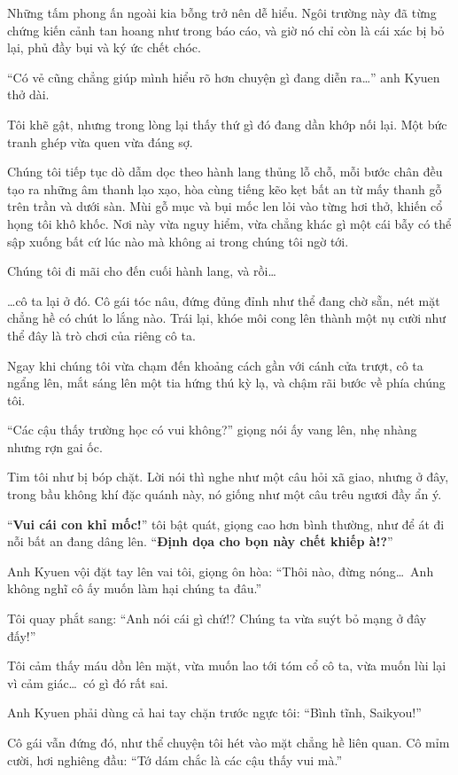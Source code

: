 \documentclass[../main.tex]{subfiles}
\begin{document}
Những tấm phong ấn ngoài kia bỗng trở nên dễ hiểu. Ngôi trường này đã từng chứng kiến cảnh tan hoang như trong báo cáo, và giờ nó chỉ còn là cái xác bị bỏ lại, phủ đầy bụi và ký ức chết chóc.

``Có vẻ cũng chẳng giúp mình hiểu rõ hơn chuyện gì đang diễn ra\dots'' anh Kyuen thở dài.

Tôi khẽ gật, nhưng trong lòng lại thấy thứ gì đó đang dần khớp nối lại. Một bức tranh ghép vừa quen vừa đáng sợ.

Chúng tôi tiếp tục dò dẫm dọc theo hành lang thủng lỗ chỗ, mỗi bước chân đều tạo ra những âm thanh lạo xạo, hòa cùng tiếng kẽo kẹt bất an từ mấy thanh gỗ trên trần và dưới sàn. Mùi gỗ mục và bụi mốc len lỏi vào từng hơi thở, khiến cổ họng tôi khô khốc. Nơi này vừa nguy hiểm, vừa chẳng khác gì một cái bẫy có thể sập xuống bất cứ lúc nào mà không ai trong chúng tôi ngờ tới.

Chúng tôi đi mãi cho đến cuối hành lang, và rồi\dots

\dots cô ta lại ở đó. Cô gái tóc nâu, đứng đủng đỉnh như thể đang chờ sẵn, nét mặt chẳng hề có chút lo lắng nào. Trái lại, khóe môi cong lên thành một nụ cười như thể đây là trò chơi của riêng cô ta.

Ngay khi chúng tôi vừa chạm đến khoảng cách gần với cánh cửa trượt, cô ta ngẩng lên, mắt sáng lên một tia hứng thú kỳ lạ, và chậm rãi bước về phía chúng tôi.

``Các cậu thấy trường học có vui không?'' giọng nói ấy vang lên, nhẹ nhàng nhưng rợn gai ốc.

Tim tôi như bị bóp chặt. Lời nói thì nghe như một câu hỏi xã giao, nhưng ở đây, trong bầu không khí đặc quánh này, nó giống như một câu trêu ngươi đầy ẩn ý.

``\textbf{Vui cái con khỉ mốc!}'' tôi bật quát, giọng cao hơn bình thường, như để át đi nỗi bất an đang dâng lên. ``\textbf{Định dọa cho bọn này chết khiếp à!?}''

Anh Kyuen vội đặt tay lên vai tôi, giọng ôn hòa: ``Thôi nào, đừng nóng\dots\ Anh không nghĩ cô ấy muốn làm hại chúng ta đâu.''

Tôi quay phắt sang: ``Anh nói cái gì chứ!? Chúng ta vừa suýt bỏ mạng ở đây đấy!''

Tôi cảm thấy máu dồn lên mặt, vừa muốn lao tới tóm cổ cô ta, vừa muốn lùi lại vì cảm giác\dots\ có gì đó rất sai.

Anh Kyuen phải dùng cả hai tay chặn trước ngực tôi: ``Bình tĩnh, Saikyou!''

Cô gái vẫn đứng đó, như thể chuyện tôi hét vào mặt chẳng hề liên quan. Cô mỉm cười, hơi nghiêng đầu: ``Tớ dám chắc là các cậu thấy vui mà.''
\end{document}
